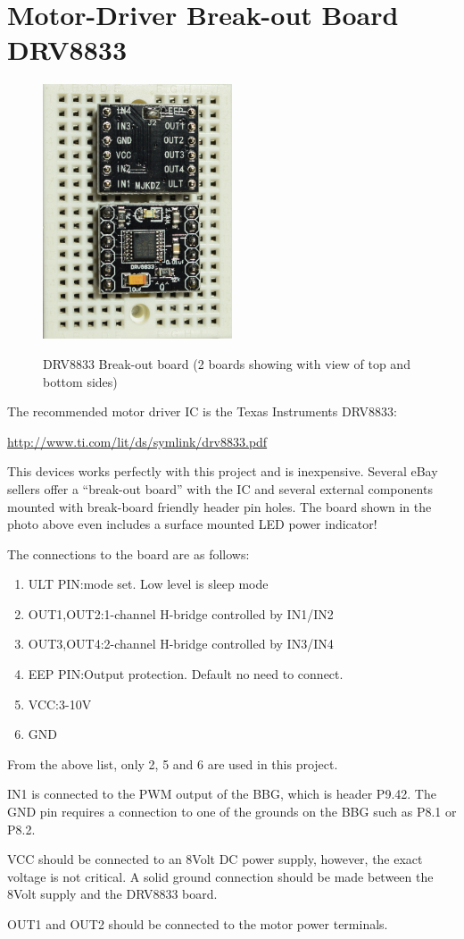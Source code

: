 \chapter{Motor-Driver Break-out Board DRV8833}

\begin{figure}[h]
	\centering
    \includegraphics[width=0.5\textwidth]{photos/drv8833_breakout.jpg}
	\centering\bfseries
	\caption{DRV8833 Break-out board (2 boards showing with view of top and bottom sides)}
\end{figure}


The recommended motor driver IC is the Texas Instruments DRV8833:

\url{http://www.ti.com/lit/ds/symlink/drv8833.pdf}

This devices works perfectly with this project and is inexpensive.
Several eBay sellers offer a ``break-out board'' with the IC and several external components mounted with break-board friendly header pin holes.  The board shown in the photo above even includes a surface mounted LED power indicator!

The connections to the board are as follows:

\begin{enumerate}
\item ULT PIN:mode set. Low level is sleep mode
\item OUT1,OUT2:1-channel H-bridge controlled by IN1/IN2
\item OUT3,OUT4:2-channel H-bridge controlled by IN3/IN4
\item EEP PIN:Output protection. Default no need to connect.
\item VCC:3-10V
\item GND
\end{enumerate}

From the above list, only 2, 5 and 6 are used in this project.

IN1 is connected to the PWM output of the BBG, which is header P9.42.
The GND pin requires a connection to one of the grounds on the BBG such as P8.1 or P8.2.

VCC should be connected to an 8Volt DC power supply, however, the exact voltage is not critical.  A solid ground connection should be made between the 8Volt supply and the DRV8833 board.

OUT1 and OUT2 should be connected to the motor power terminals.

